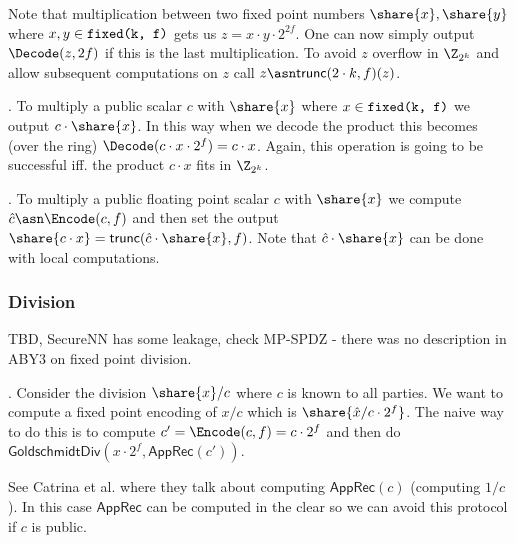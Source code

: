  Note that
multiplication between two fixed point numbers $\share{x}, \share{y}$ where
$x,y \in \verb|fixed(k, f)|$ gets us $z = x \cdot y \cdot 2^{2f}$. One can
now simply output $\Decode(z, 2f)$ if this is the last multiplication.
To avoid $z$ overflow in $\Z_{2^k}$ and allow
subsequent computations on $z$ call $z \asn \mathsf{trunc}(2 \cdot k, f)(z)$.

.
To multiply a public scalar
$c$ with $\share{x}$ where $x \in \verb|fixed(k, f)|$ we output
$c \cdot \share{x}$. In this way when we decode the product
this becomes (over the ring)
$\Decode(c \cdot x \cdot 2^f) = c \cdot x$. Again, this operation is going to
be successful iff. the product $c \cdot x$ fits in $\Z_{2^k}$.

. To multiply a
public floating point scalar $c$ with $\share{x}$ we compute $\hat{c} \asn
\Encode(c, f)$ and then set the output $\share{c \cdot x} =
\mathsf{trunc}(\hat{c} \cdot \share{x}, f)$. Note that $\hat{c} \cdot \share{x}$
can be done with local computations.

\subsubsection{Division}
TBD, SecureNN has some leakage, check MP-SPDZ - there was no description in
ABY3 on fixed point division.

.
Consider the division $\share{x} / c$ where $c$ is known to all parties. We want to compute a
fixed point encoding of $x/c$ which is $\share{\hat{x} / c \cdot 2^f}$. The naive way to do
this is to compute $c' = \Encode(c, f) = c \cdot 2^f$ and then do
$\mathsf{GoldschmidtDiv}(x \cdot 2^f, \mathsf{AppRec}(c'))$.

See Catrina et al. where they talk about computing $\mathsf{AppRec}(c)$ (computing $1/c$). In this
case $\mathsf{AppRec}$ can be computed in the clear so we can avoid this protocol if $c$ is public.



